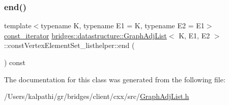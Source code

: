 \mbox{\label{classbridges_1_1datastructure_1_1_graph_adj_list_1_1const_vertex_element_set__listhelper_a836477771db915bc417ab9f2811ac7c2}} 
\subsubsection{\texorpdfstring{end()}{end()}}
{\footnotesize\ttfamily template$<$typename K, typename E1 = K, typename E2 = E1$>$ \\
\mbox{\hyperlink{classbridges_1_1datastructure_1_1_graph_adj_list_1_1const_vertex_element_set__listhelper_1_1const__iterator}{const\+\_\+iterator}} \mbox{\hyperlink{classbridges_1_1datastructure_1_1_graph_adj_list}{bridges\+::datastructure\+::\+Graph\+Adj\+List}}$<$ K, E1, E2 $>$\+::const\+Vertex\+Element\+Set\+\_\+listhelper\+::end (\begin{DoxyParamCaption}{ }\end{DoxyParamCaption}) const\hspace{0.3cm}{\ttfamily [inline]}}



The documentation for this class was generated from the following file\+:\begin{DoxyCompactItemize}
\item 
/\+Users/kalpathi/gr/bridges/client/cxx/src/\mbox{\hyperlink{_graph_adj_list_8h}{Graph\+Adj\+List.\+h}}\end{DoxyCompactItemize}
